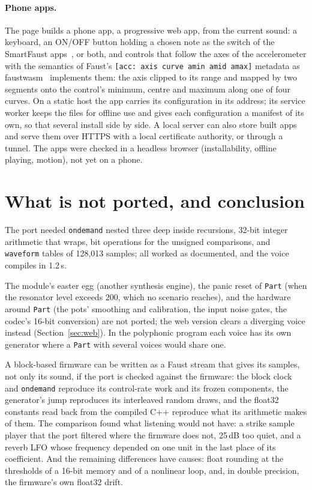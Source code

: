 \documentclass[10pt,a4paper,twocolumn]{article}
\newcommand{\code}[1]{\texttt{#1}}
\begin{document}
\paragraph{Phone apps.} The page builds a phone app, a progressive web app, from the current sound: a keyboard, an ON/OFF button holding a chosen note as the switch of the SmartFaust apps~\cite{smartfaust}, or both, and controls that follow the axes of the accelerometer with the semantics of Faust's \code{[acc: axis curve amin amid amax]} metadata as faustwasm~\cite{faustwasm} implements them: the axis clipped to its range and mapped by two segments onto the control's minimum, centre and maximum along one of four curves. On a static host the app carries its configuration in its address; its service worker keeps the files for offline use and gives each configuration a manifest of its own, so that several install side by side. A local server can also store built apps and serve them over HTTPS with a local certificate authority, or through a tunnel. The apps were checked in a headless browser (installability, offline playing, motion), not yet on a phone.

\section{What is not ported, and conclusion}

The port needed \code{ondemand} nested three deep inside recursions, 32-bit integer arithmetic that wraps, bit operations for the unsigned comparisons, and \code{waveform} tables of 128,013 samples; all worked as documented, and the voice compiles in 1.2\,s.

The module's easter egg (another synthesis engine), the panic reset of \code{Part} (when the resonator level exceeds 200, which no scenario reaches), and the hardware around \code{Part} (the pots' smoothing and calibration, the input noise gates, the codec's 16-bit conversion) are not ported; the web version clears a diverging voice instead (Section~\ref{sec:web}). In the polyphonic program each voice has its own generator where a \code{Part} with several voices would share one.

A block-based firmware can be written as a Faust stream that gives its samples, not only its sound, if the port is checked against the firmware: the block clock and \code{ondemand} reproduce its control-rate work and its frozen components, the generator's jump reproduces its interleaved random draws, and the float32 constants read back from the compiled C++ reproduce what its arithmetic makes of them. The comparison found what listening would not have: a strike sample player that the port filtered where the firmware does not, 25\,dB too quiet, and a reverb LFO whose frequency depended on one unit in the last place of its coefficient. And the remaining differences have causes: float rounding at the thresholds of a 16-bit memory and of a nonlinear loop, and, in double precision, the firmware's own float32 drift.



\end{document}
